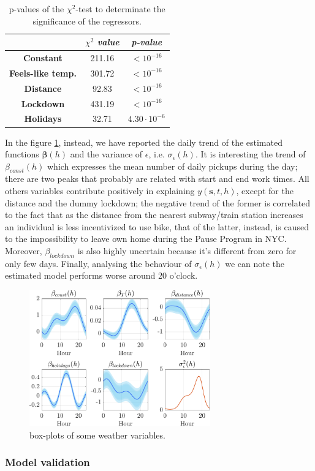 \begin{table}[h!]
	\centering
	\renewcommand\arraystretch{1.3}
	\begin{tabular}{c|c|c}
		\hline
		\textit{} & $\chi^2$ \textit{value} & \textit{p-value} \\
		\hline
		\textbf{Constant} & \num{211.16} & $< 10^{-16}$ \\
		\hline
		\textbf{Feels-like temp.} & \num{301.72} & $< 10^{-16}$ \\
		\hline
		\textbf{Distance} & \num{92.83} & $<10^{-16}$ \\
		\hline
		\textbf{Lockdown} & \num{431.19} & $<10^{-16}$ \\
		\hline
		\textbf{Holidays} & \num{32.71} & $4.30 \cdot 10^{-6}$ \\
		\hline
	\end{tabular}
	\caption[p-values of the $\chi^2$-test to determinate the significance of the regressors (f-HDGM)]{p-values of the $\chi^2$-test to determinate the significance of the regressors.}
	\label{Chi2_p_values}
\end{table}

\noindent
In the figure \ref{Trend_beta_M}, instead, we have reported the daily trend of the estimated functions $\boldsymbol{\beta}(h)$ and the variance of $\epsilon$, i.e. $\sigma_{\epsilon}(h)$. It is interesting the trend of $\beta_{const}(h)$ which expresses the mean number of daily pickups during the day; there are two peaks that probably are related with start and end work times. All others variables contribute positively in explaining $y(\boldsymbol{s}, t, h)$, except for the distance and the dummy lockdown; the negative trend of the former is correlated to the fact that as the distance from the nearest subway/train station increases an individual is less incentivized to use bike, that of the latter, instead, is caused to the impossibility to leave own home during the Pause Program in NYC. Moreover, $\beta_{lockdown}$ is also highly uncertain because it's different from zero for only few days. Finally, analysing the behaviour of $\sigma_{\epsilon}(h)$ we can note the estimated model performs worse around 20 o'clock.

\begin{figure}[h!]
	\centering
	\includegraphics[height=222px]{Images/Data analysis/f-HDGM/Chosen/Trend_beta_M.pdf}
	\caption{box-plots of some weather variables.}
	\label{Trend_beta_M}
\end{figure}

\subsubsection{Model validation}